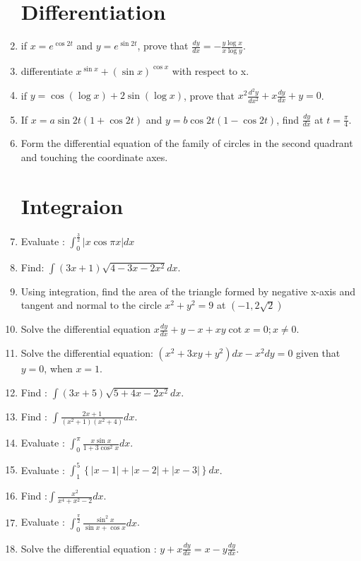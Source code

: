 \documentclass[12pt,-letter paper]{article}
\theoremstyle{remark}
\providecommand{\brak}[1]{\ensuremath{\left(#1\right)}}
\providecommand{\cbrak}[1]{\ensuremath{\left\{#1\right\}}}
\providecommand{\abs}[1]{\left\vert#1\right\vert}
\begin{document}
\begin{enumerate}
            \section{Differentiation}
      \item if $x=e^{\cos 2t}$ and $y=e^{\sin 2t}$, prove that $\frac{dy}{dx}= -\frac{y \log x}{x \log y}$.
      \item differentiate $x^{\sin x}+ \brak{\sin x}^{\cos x}$ with respect to x.
      \item if $y=\cos \brak{\log x} + 2 \sin \brak{\log x}$, prove that $x^2 \frac{d^2 y}{dx^2} + x \frac{dy}{dx} +y =0$.
      \item If $x=a\sin 2t\brak{1+\cos 2t}$ and $y=b\cos 2t\brak{1-\cos 2t}$, find $\frac{dy}{dx}$ at $t=\frac{\pi}{4}$.
      \item Form the differential equation of the family of circles in the second quadrant and touching the coordinate axes.
            \section{Integraion}
      \item Evaluate : $\int_{0}^{\frac{3}{2}} \abs{x \cos \pi x}dx$
      \item Find: $\int \brak{3x +1}\sqrt{4-3x-2x^2} dx$.
      \item Using integration, find the area of the triangle formed by negative x-axis and tangent and normal to the circle $x^2 + y^2 =9$ at \brak{-1,2\sqrt{2}}
      \item Solve the differential equation $x\frac{dy}{dx} +y -x +xy \cot x= 0; x\neq 0$.
      \item Solve the differential equation: $\brak{x^2+3xy+y^2}dx -x^2dy = 0$ given that $y=0$, when $x=1$.
      \item Find : $\int \brak{3x+5}\sqrt{5+4x-2x^2}dx$.
      \item Find : $\int \frac{2x+1}{\brak{x^2+1}\brak{x^2+4}}dx$.
      \item Evaluate : $\int_{0}^{\pi}\frac{x\sin x}{1+3\cos^2 x}dx$.
      \item Evaluate : $\int_{1}^{5}\cbrak{\abs{x-1}+\abs{x-2}+\abs{x-3}}dx$.
      \item Find :$\int \frac{x^2}{x^4 + x^2 -2}dx$.
      \item Evaluate : $\int_{0}^{\frac{\pi}{2}} \frac{\sin^2 x}{\sin x + \cos x} dx$.
      \item Solve the differential equation : $y+ x\frac{dy}{dx} = x-y\frac{dy}{dx}$.

\end{enumerate}
\end{document}
